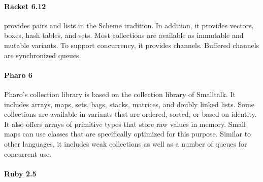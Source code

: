 \documentclass[sigconf, authorversion]{acmart}
\begin{document}

\paragraph{Racket 6.12}

 provides pairs and lists in the Scheme tradition.
In addition, it provides vectors, boxes, hash tables, and sets.
Most collections are available as immutable and mutable variants.
To support concurrency, it provides channels.
Buffered channels are synchronized queues.

\paragraph{Pharo 6}
Pharo's collection library is based on the collection library
of Smalltalk\citep{Smalltalk80,Cook:1992:ISS}.
It includes arrays, maps, sets, bags, stacks, matrices, and doubly linked lists.
Some collections are available in variants that are ordered, sorted,
or based on identity.
It also offers arrays of primitive types that store raw values in memory.
Small maps can use classes that are specifically optimized for this purpose.
Similar to other languages,
it includes weak collections as well as a number of queues for concurrent use.

\paragraph{Ruby 2.5}
\end{document}
